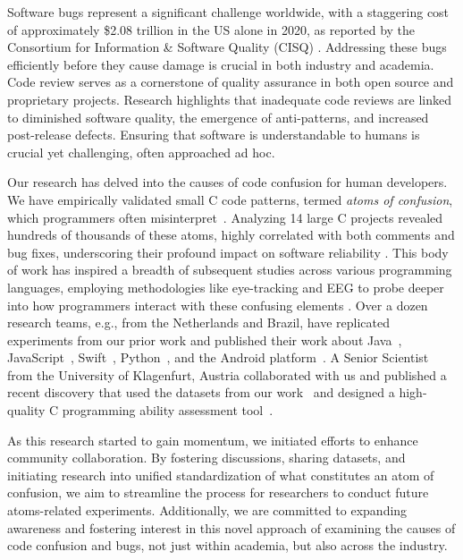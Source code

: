 \documentclass[conference]{IEEEtran}
\begin{document}
Software bugs represent a significant challenge worldwide, 
with a staggering cost of approximately \$2.08 trillion in the 
US alone in 2020, as reported by the Consortium for 
Information \& Software Quality (CISQ) \cite{CPSQ2020}. 
Addressing these bugs efficiently before they cause damage is 
crucial in both industry and academia.
%
Code review serves as a cornerstone of quality assurance in 
both open source and proprietary projects. Research highlights 
that inadequate code reviews are linked to diminished software 
quality, the emergence of anti-patterns, and increased 
post-release defects. %
Ensuring that software is understandable to 
humans is crucial yet challenging, often approached ad hoc.

Our research has delved into the causes of code confusion for 
human developers. We have empirically validated 
small C code patterns, termed \emph{atoms of confusion}, which 
programmers often misinterpret~\cite{gopstein2017understanding}. Analyzing 14 large C projects 
revealed hundreds of thousands of these atoms, highly 
correlated with both comments and bug fixes, underscoring 
their profound impact on software reliability 
\cite{gopstein2018prevalence}.
%
This body of work has inspired a breadth of subsequent studies 
across various programming languages, employing methodologies 
like eye-tracking and EEG to probe deeper into how programmers 
interact with these confusing elements 
\cite{langhout2021atoms, 
torres2023investigation, dacosta2023seeing, 
Manor2018AtomsConfusionSwift, yeh2017detecting}. Over a dozen research teams, e.g., from the Netherlands and Brazil, have replicated experiments from our prior work and published their work about Java~\cite{langhout2021atoms, mendes2022dazed}, JavaScript~\cite{oliveira2019impact},  Swift~\cite{castor2018identifying}, Python~\cite{da2023seeing}, and the Android platform~\cite{tabosa2024dataset}. A Senior Scientist from the University of Klagenfurt, Austria collaborated with us and published a recent discovery that used the datasets from our work~\cite{gopstein2017understanding, zhuang2023developer} and designed a high-quality C programming ability assessment tool~\cite{glasauer2024c}.

As this research started to gain momentum, we initiated 
efforts to enhance community collaboration. By fostering 
discussions, sharing datasets, and initiating research into 
unified standardization of what constitutes an atom of 
confusion, we aim to streamline the process for researchers to 
conduct future atoms-related experiments. Additionally, we are 
committed to expanding awareness and fostering interest in 
this novel approach of examining the causes of code confusion 
and bugs, not just within academia, but also across the 
industry.
\end{document}
